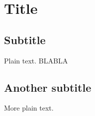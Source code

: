 \documentclass{article}
\begin{document}
\section{Title}

\subsection{Subtitle}

Plain text. BLABLA

\subsection{Another subtitle}

More plain text.
\end{document}
